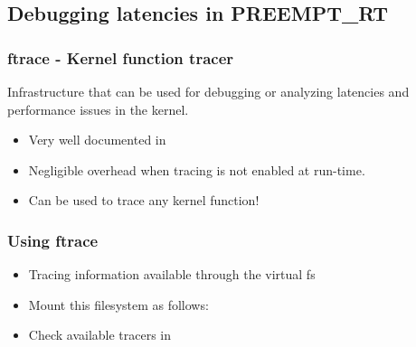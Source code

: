 \subsection{Debugging latencies in PREEMPT\_RT}

\begin{frame}
  \frametitle{ftrace - Kernel function tracer}

  Infrastructure that can be used for debugging or analyzing latencies
  and performance issues in the kernel.

  \begin{itemize}
  \item Very well documented in 
  \item Negligible overhead when tracing is not enabled at run-time.
  \item Can be used to trace any kernel function!
  \end{itemize}
\end{frame}

\begin{frame}
  \frametitle{Using ftrace}
  \begin{itemize}
  \item Tracing information available through the  virtual fs
  \item Mount this filesystem as follows:\\
  \item Check available tracers in
  \end{itemize}
\end{frame}


